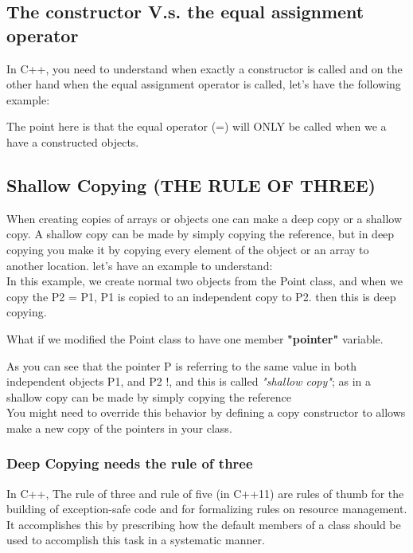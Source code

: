 \documentclass{article}
\begin{document}
\subsection{The constructor V.s. the equal assignment operator}
In C++, you need to understand when exactly a constructor is called and on the other hand when the equal assignment operator is called, let's have the following example:



The point here is that the equal operator (=) will ONLY be called when we a have a constructed objects.

\subsection{Shallow Copying (THE RULE OF THREE)}
\label{shallow_copy}
When creating copies of arrays or objects one can make a deep copy or a shallow copy. A shallow copy can be made by simply copying the reference, but in deep copying you make it by copying every element of the object or an array to another location. let's have an example to understand:\\
In this example, we create normal two objects from the Point class, and when we copy the P2 = P1, P1 is copied to an independent copy to P2. then this is deep copying.


What if we modified the Point class to have one member \textbf{"pointer"} variable.


As you can see that the pointer P is referring to the same value in both independent objects P1, and P2 !, and this is called \textit{"shallow copy"}; as in a shallow copy can be made by simply copying the reference\\
You might need to override this behavior by defining a copy constructor to allows make a new copy of the pointers in your class.



\subsubsection{Deep Copying needs the rule of three}
In C++, The rule of three and rule of five (in C++11) are rules of thumb for the building of exception-safe code and for formalizing rules on resource management. It accomplishes this by prescribing how the default members of a class should be used to accomplish this task in a systematic manner.\\
\end{document}
